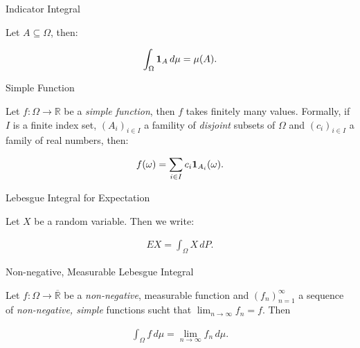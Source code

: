 \begin{definition}{}{Indicator Integral}

    Let $A \subseteq \Omega$, then:

        \begin{align*}
            \int_{\Omega} \mathbf{1}_{A} \,d\mu = \mu(A).
        \end{align*}

\end{definition}

\begin{definition}{}{Simple Function}

    Let $f: \Omega \to \mathbb{R}$ be a \emph{simple function}, then $f$ takes finitely many values. Formally, if $I$ is a finite index set, $(A_i)_{i \in I}$ a famility of \emph{disjoint} subsets of $\Omega$ and $(c_i)_{i \in I}$ a family of real numbers, then:

        \begin{align*}
            f(\omega) = \sum_{i \in I} c_i \mathbf{1}_{A_i}(\omega).
        \end{align*}

\end{definition}

\begin{definition}{}{Lebesgue Integral for Expectation}

    Let $X$ be a random variable. Then we write:

        \begin{align*}
            EX = \int_{\Omega} X \,dP.
        \end{align*}

\end{definition}

\begin{definition}{}{Non-negative, Measurable Lebesgue Integral}

    Let $f: \Omega \to \overline{\mathbb{R}}$ be a \emph{non-negative}, measurable function and $(f_n)_{n=1}^{\infty}$ a sequence of \emph{non-negative, simple} functions sucht that $\lim_{n \to \infty} f_n = f$. Then

        \begin{align*}
            \int_{\Omega} f \, d\mu = \lim_{n \to \infty} f_n \, d\mu.
        \end{align*}

\end{definition}

